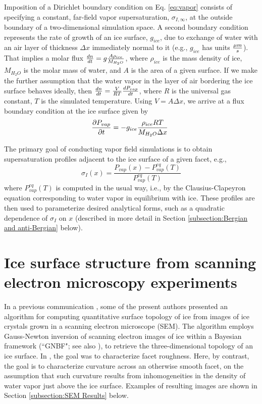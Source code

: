 \documentclass[draft]{agujournal2019}
\begin{document}
Imposition of a Dirichlet boundary condition on Eq. \ref{eq:vapor} consists of specifying a constant, far-field vapor supersaturation, $\sigma_{I,\infty}$, at the outside boundary of a two-dimensional simulation space. A second boundary condition represents the rate of growth of an ice surface, $g_{ice}$, due to exchange of water with an air layer of thickness $\Delta x$ immediately normal to it (e.g., $g_{ice}$ has units ${\mu m \over s}$). That implies a molar flux ${dn \over dt}=g{A \rho_{ice} \over M_{H_2O}}$, where $\rho_{ice}$ is the mass density of ice, $M_{H_2O}$ is the molar mass of water, and $A$ is the area of a given surface. If we make the further assumption that the water vapor in the layer of air bordering the ice surface behaves ideally, then ${dn\over dt}={V \over RT}{dP_{vap} \over dt}$, where $R$ is the universal gas constant, $T$ is the simulated temperature. Using $V=A \Delta x$, we arrive at a flux boundary condition at the ice surface given by
\begin{equation}
    \frac{\partial P_{vap}}{\partial t} = -g_{ice} {\rho_{ice} RT \over M_{H_2O} \Delta x}\
    \label{eq:Neumann}
\end{equation} 

The primary goal of conducting vapor field simulations is to obtain supersaturation profiles adjacent to the ice surface of a given facet, e.g.,
\begin{equation}
    \sigma_I(x) = \frac {P_{vap}(x)-P_{vap}^{eq}(T)}{P_{vap}^{eq}(T)}
    \label{eq:sigmaI_VF}
\end{equation}
where $P_{vap}^{eq}(T)$ is computed in the usual way, i.e., by the Clausius-Clapeyron equation corresponding to water vapor in equilibrium with ice. These profiles are then used to parameterize desired analytical forms, such as a quadratic dependence of $\sigma_I$ on $x$ (described in more detail in Section \ref{subsection:Bergian and anti-Bergian} below).

\section{Ice surface structure from scanning electron microscopy experiments}
In a previous communication \cite{butterfield_quantitative_2017}, some of the present authors presented an algorithm for computing quantitative surface topology of ice from images of ice crystals grown in a scanning electron microscope (SEM). The algorithm employs Gauss-Newton inversion of scanning electron images of ice within a Bayesian framework (``GNBF"; see also \cite{rodgers_inverse_2000}), to retrieve the three-dimensional topology of an ice surface. In \cite{butterfield_quantitative_2017}, the goal was to characterize facet roughness. Here, by contrast, the goal is to characterize curvature across an otherwise smooth facet, on the assumption that such curvature results from inhomogeneities in the density of water vapor just above the ice surface. Examples of resulting images are shown in Section \ref{subsection:SEM Results} below.
\end{document}
